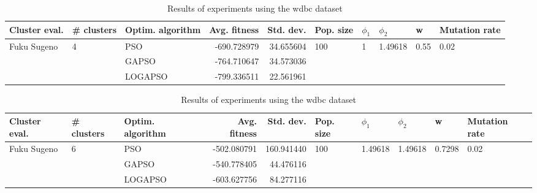 \documentclass{article}
\begin{document}
\begin{table}
\centering
\caption{Results of experiments using the wdbc dataset}
\begin{tabular}{lllrrlllll}
\toprule
               Cluster eval. &        \# clusters & Optim. algorithm &  Avg. fitness &  Std. dev. &            Pop. size &         $\phi_{1}$ &               $\phi_{2}$ &                     w &         Mutation rate \\
\midrule
\multirow{3}{*}{Fuku Sugeno} & \multirow{3}{*}{4} &              PSO &   -690.728979 &  34.655604 & \multirow{3}{*}{100} & \multirow{3}{*}{1} & \multirow{3}{*}{1.49618} & \multirow{3}{*}{0.55} & \multirow{3}{*}{0.02} \\
                             &                    &            GAPSO &   -764.710647 &  34.573036 &                      &                    &                          &                       &                       \\
                             &                    &          LOGAPSO &   -799.336511 &  22.561961 &                      &                    &                          &                       &                       \\
\bottomrule
\end{tabular}
\end{table}
\begin{table}
\centering
\caption{Results of experiments using the wdbc dataset}
\begin{tabular}{lllrrlllll}
\toprule
               Cluster eval. &        \# clusters & Optim. algorithm &  Avg. fitness &  Std. dev. &            Pop. size &               $\phi_{1}$ &               $\phi_{2}$ &                       w &         Mutation rate \\
\midrule
\multirow{3}{*}{Fuku Sugeno} & \multirow{3}{*}{6} &              PSO &   -502.080791 & 160.941440 & \multirow{3}{*}{100} & \multirow{3}{*}{1.49618} & \multirow{3}{*}{1.49618} & \multirow{3}{*}{0.7298} & \multirow{3}{*}{0.02} \\
                             &                    &            GAPSO &   -540.778405 &  44.476116 &                      &                          &                          &                         &                       \\
                             &                    &          LOGAPSO &   -603.627756 &  84.277116 &                      &                          &                          &                         &                       \\
\bottomrule
\end{tabular}
\end{table}
\end{document}

